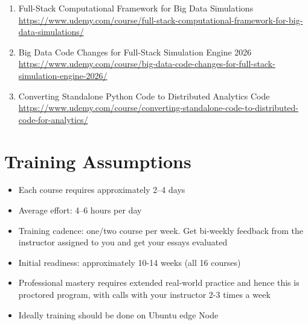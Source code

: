 \documentclass[12pt]{article}
\begin{document}
\begin{enumerate}[label=\textbf{Course \arabic*:}]
		\item Full-Stack Computational Framework for Big Data Simulations \\
		\href{https://www.udemy.com/course/full-stack-computational-framework-for-big-data-simulations/}
		{https://www.udemy.com/course/full-stack-computational-framework-for-big-data-simulations/}
		
		\item Big Data Code Changes for Full-Stack Simulation Engine 2026 \\
		\href{https://www.udemy.com/course/big-data-code-changes-for-full-stack-simulation-engine-2026/}
		{https://www.udemy.com/course/big-data-code-changes-for-full-stack-simulation-engine-2026/}
		
		\item Converting Standalone Python Code to Distributed Analytics Code \\
		\href{https://www.udemy.com/course/converting-standalone-code-to-distributed-code-for-analytics/}
		{https://www.udemy.com/course/converting-standalone-code-to-distributed-code-for-analytics/}
		
	\end{enumerate}
	
	\section*{Training Assumptions}
	
	\begin{itemize}
		\item Each course requires approximately 2–4 days
		\item Average effort: 4–6 hours per day
		\item Training cadence: one/two course per week. Get bi-weekly feedback from the instructor assigned to you and get your essays evaluated 
		\item Initial readiness: approximately 10-14 weeks (all 16 courses)
		\item Professional mastery requires extended real-world practice and hence this is proctored program, with calls with your instructor 2-3 times a week
		\item Ideally training should be done on Ubuntu edge Node
	\end{itemize}
	
	\newpage
	
\end{document}
